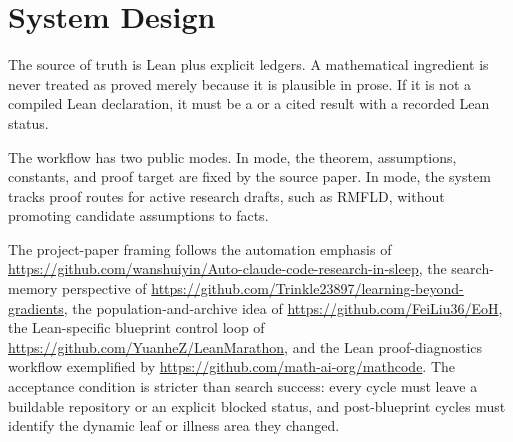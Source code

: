 \section{System Design}

The source of truth is Lean plus explicit ledgers.  A mathematical ingredient
is never treated as proved merely because it is plausible in prose.  If it is
not a compiled Lean declaration, it must be a \ProofObligation{} or a cited
result with a recorded Lean status.

The workflow has two public modes.  In  mode, the theorem,
assumptions, constants, and proof target are fixed by the source paper.  In
 mode, the system tracks proof routes for active
research drafts, such as RMFLD, without promoting candidate assumptions to
facts.

The project-paper framing follows the automation emphasis of
\url{https://github.com/wanshuiyin/Auto-claude-code-research-in-sleep}, the search-memory perspective of \url{https://github.com/Trinkle23897/learning-beyond-gradients}, the
population-and-archive idea of \url{https://github.com/FeiLiu36/EoH}, the Lean-specific blueprint
control loop of \url{https://github.com/YuanheZ/LeanMarathon}, and the Lean proof-diagnostics
workflow exemplified by \url{https://github.com/math-ai-org/mathcode}.  The acceptance condition is
stricter than search success: every cycle must leave a buildable repository or
an explicit blocked status, and post-blueprint cycles must identify the
dynamic leaf or illness area they changed.


